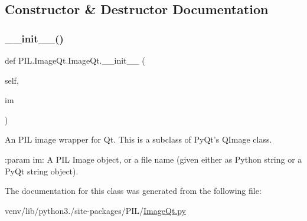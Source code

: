 \subsection{Constructor \& Destructor Documentation}
\mbox{\label{classPIL_1_1ImageQt_1_1ImageQt_ae0121658d7b1c941d4cbe604170cd898}} 
\subsubsection{\texorpdfstring{\+\_\+\+\_\+init\+\_\+\+\_\+()}{\_\_init\_\_()}}
{\footnotesize\ttfamily def P\+I\+L.\+Image\+Qt.\+Image\+Qt.\+\_\+\+\_\+init\+\_\+\+\_\+ (\begin{DoxyParamCaption}\item[{}]{self,  }\item[{}]{im }\end{DoxyParamCaption})}

\begin{DoxyVerb}An PIL image wrapper for Qt.  This is a subclass of PyQt's QImage
class.

:param im: A PIL Image object, or a file name (given either as
    Python string or a PyQt string object).
\end{DoxyVerb}
 

The documentation for this class was generated from the following file\+:\begin{DoxyCompactItemize}
\item 
venv/lib/python3./site-\/packages/\+P\+I\+L/\hyperlink{ImageQt_8py}{Image\+Qt.\+py}\end{DoxyCompactItemize}
